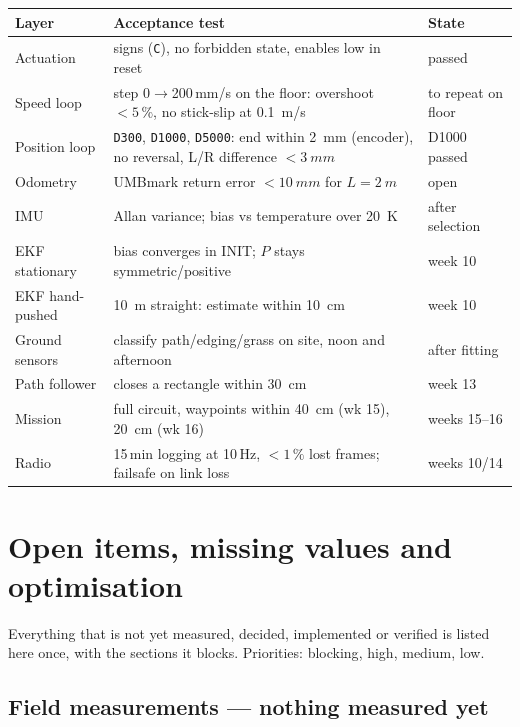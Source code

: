 \documentclass[11pt,a4paper]{article}
\newcommand{\tg}[1]{{\small\textcolor{good}{\textsf{#1}}}}
\newcommand{\tw}[1]{{\small\textcolor{warn}{\textsf{#1}}}}
\newcommand{\tk}[1]{{\small\textcolor{cold}{\textsf{#1}}}}
\newcommand{\tb}[1]{{\small\textcolor{bad}{\textsf{#1}}}}
\newcommand{\code}[1]{\texttt{\small #1}}
\begin{document}
\begin{center}
\small
\begin{tabularx}{\textwidth}{@{}lLl@{}}
\toprule
\textbf{Layer} & \textbf{Acceptance test} & \textbf{State}\\
\midrule
Actuation & signs (\code{C}), no forbidden state, enables low in reset & \tg{passed}\\
Speed loop & step 0$\to$200\,mm/s on the floor: overshoot $<5\,\%$, no stick-slip at \qty{0.1}{m/s} & \tw{to repeat on floor}\\
Position loop & \code{D300}, \code{D1000}, \code{D5000}: end within \qty{2}{mm} (encoder), no reversal, L/R difference $<\qty{3}{mm}$ & \tw{D1000 passed}\\
Odometry & UMBmark return error $<\qty{10}{mm}$ for $L=\qty{2}{m}$ & \tk{open}\\
IMU & Allan variance; bias vs temperature over \qty{20}{K} & \tk{after selection}\\
EKF stationary & bias converges in INIT; $P$ stays symmetric/positive & \tk{week 10}\\
EKF hand-pushed & \qty{10}{m} straight: estimate within \qty{10}{cm} & \tk{week 10}\\
Ground sensors & classify path/edging/grass on site, noon and afternoon & \tk{after fitting}\\
Path follower & closes a  rectangle within \qty{30}{cm} & \tk{week 13}\\
Mission & full circuit, waypoints within \qty{40}{cm} (wk 15), \qty{20}{cm} (wk 16) & \tk{weeks 15--16}\\
Radio & 15\,min logging at 10\,Hz, $<1\,\%$ lost frames; failsafe on link loss & \tk{weeks 10/14}\\
\bottomrule
\end{tabularx}
\end{center}
\clearpage
\section{Open items, missing values and optimisation}\label{sec:open}

Everything that is not yet measured, decided, implemented or verified is listed
here once, with the sections it blocks. Priorities: \tb{blocking},
\tw{high}, \tk{medium}, low.

\subsection{Field measurements --- nothing measured yet}\label{sec:open-field}
\end{document}
